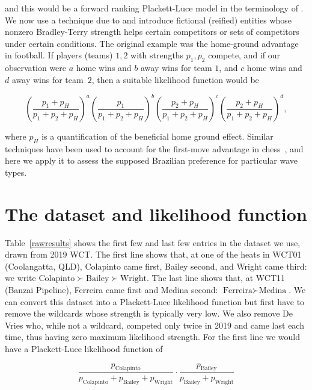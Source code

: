 \documentclass{article}
\begin{document}
and this would be a forward ranking Plackett-Luce model in the
terminology of \citet{johnson2020}.  We now use a technique due to
\citet{hankin2010,hankin2017_nomarkup} and introduce fictional (reified)
entities whose nonzero Bradley-Terry strength helps certain
competitors or sets of competitors under certain conditions.  The
original example was the home-ground advantage in football.  If
players (teams) $1,2$ with strengths $p_1,p_2$ compete, and if our
observation were $a$ home wins and $b$ away wins for team $1$, and $c$
home wins and $d$ away wins for team~$2$, then a suitable likelihood
function would be

\begin{equation}\label{home_ground_advantage}
\left(\frac{p_1+p_H}{p_1+p_2+p_H}\right)^a
\left(\frac{p_1}{p_1+p_2+p_H}\right)^b
\left(\frac{p_2+p_H}{p_1+p_2+p_H}\right)^c
\left(\frac{p_2+p_H}{p_1+p_2+p_H}\right)^d,
\end{equation}

\noindent where $p_H$ is a quantification of the beneficial home
ground effect.  Similar techniques have been used to account for the
first-move advantage in chess~\citep{hankin2020}, and here we apply it
to assess the supposed Brazilian preference for particular wave types.

\section{The dataset and likelihood function}

Table~\ref{rawresults} shows the first few and last few entries in the
dataset we use, drawn from 2019 WCT.  The first line shows that, at
one of the heats in WCT01 (Coolangatta, QLD), Colapinto came first,
Bailey second, and Wright came third: we write
$\mbox{Colapinto}\succ\mbox{Bailey}\succ\mbox{Wright}$.  The last line
shows that, at WCT11 (Banzai Pipeline), Ferreira came first and Medina
second: $\mbox{Ferreira}\succ\mbox{Medina}$.  We can convert this
dataset into a Plackett-Luce likelihood function but first have to
remove the wildcards whose strength is typically very low.  We also
remove De Vries who, while not a wildcard, competed only twice in 2019
and came last each time, thus having zero maximum likelihood strength.
For the first line we would have a Plackett-Luce likelihood function of

\begin{equation}
\frac{p_\mathrm{Colapinto}}{p_\mathrm{Colapinto} + p_\mathrm{Bailey} + p_\mathrm{Wright}}\cdot
\frac{p_\mathrm{Bailey}}{p_\mathrm{Bailey} + p_\mathrm{Wright}}
\end{equation}
\end{document}
